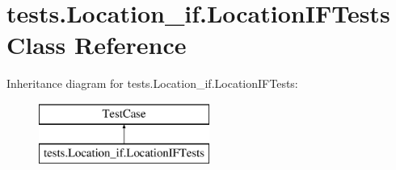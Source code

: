 \hypertarget{classtests_1_1_location__if_1_1_location_i_f_tests}{\section{tests.\-Location\-\_\-if.\-Location\-I\-F\-Tests Class Reference}
\label{classtests_1_1_location__if_1_1_location_i_f_tests}
}
Inheritance diagram for tests.\-Location\-\_\-if.\-Location\-I\-F\-Tests\-:\begin{figure}[H]
\begin{center}
\leavevmode
\includegraphics[height=2.000000cm]{classtests_1_1_location__if_1_1_location_i_f_tests}
\end{center}
\end{figure}
